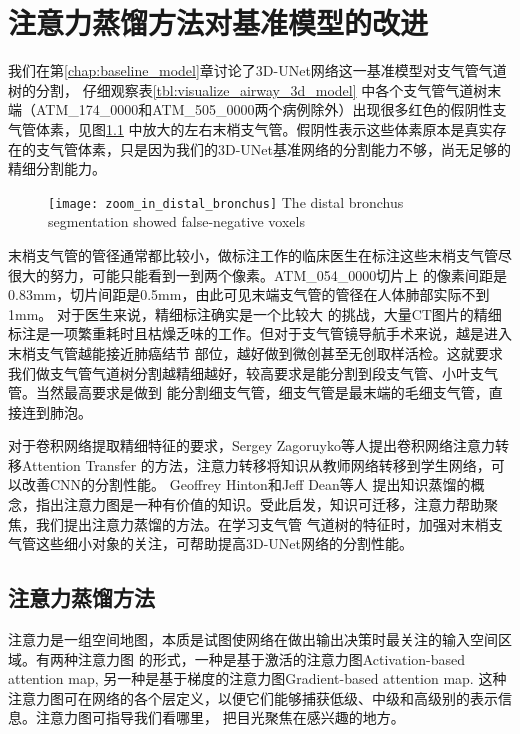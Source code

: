 
\chapter{注意力蒸馏方法对基准模型的改进}\label{chap:attention_distillation}

我们在第\ref{chap:baseline_model}章讨论了3D-UNet网络这一基准模型对支气管气道树的分割， 仔细观察表\ref{tbl:visualize_airway_3d_model}
中各个支气管气道树末端（ATM\_174\_0000和ATM\_505\_0000两个病例除外）出现很多红色的假阴性支气管体素，见图\ref{fig:distal_bronchus}
中放大的左右末梢支气管。假阴性表示这些体素原本是真实存在的支气管体素，只是因为我们的3D-UNet基准网络的分割能力不够，尚无足够的精细分割能力。
\begin{figure}[!htp]
    \centering
    \texttt{[image: zoom\_in\_distal\_bronchus]}
        {The distal bronchus segmentation showed false-negative voxels}
    \label{fig:distal_bronchus}
\end{figure}
末梢支气管的管径通常都比较小，做标注工作的临床医生在标注这些末梢支气管尽很大的努力，可能只能看到一到两个像素。ATM\_054\_0000切片上
的像素间距是0.83mm，切片间距是0.5mm，由此可见末端支气管的管径在人体肺部实际不到1mm。 对于医生来说，精细标注确实是一个比较大
的挑战，大量CT图片的精细标注是一项繁重耗时且枯燥乏味的工作。但对于支气管镜导航手术来说，越是进入末梢支气管越能接近肺癌结节
部位，越好做到微创甚至无创取样活检。这就要求我们做支气管气道树分割越精细越好，较高要求是能分割到段支气管、小叶支气管。当然最高要求是做到
能分割细支气管，细支气管是最末端的毛细支气管，直接连到肺泡。

对于卷积网络提取精细特征的要求，Sergey Zagoruyko等人\cite{Zagoruyko2016PayingMA}提出卷积网络注意力转移Attention Transfer
的方法，注意力转移将知识从教师网络转移到学生网络，可以改善CNN的分割性能。 Geoffrey Hinton和Jeff Dean等人\cite{Hinton2015DistillingTK}
提出知识蒸馏的概念，指出注意力图是一种有价值的知识。受此启发，知识可迁移，注意力帮助聚焦，我们提出注意力蒸馏的方法。在学习支气管
气道树的特征时，加强对末梢支气管这些细小对象的关注，可帮助提高3D-UNet网络的分割性能。

\section{注意力蒸馏方法}

注意力是一组空间地图，本质是试图使网络在做出输出决策时最关注的输入空间区域\cite{Zagoruyko2016PayingMA}。有两种注意力图
的形式，一种是基于激活的注意力图Activation-based attention map, 另一种是基于梯度的注意力图Gradient-based 
attention map. 这种注意力图可在网络的各个层定义，以便它们能够捕获低级、中级和高级别的表示信息。注意力图可指导我们看哪里，
把目光聚焦在感兴趣的地方。 

